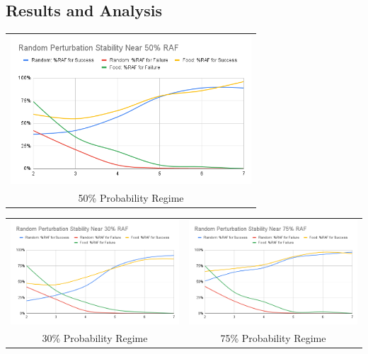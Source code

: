 \documentclass[11pt]{article}
\begin{document}
\subsection{Results and Analysis} 

\begin{center}
\begin{frame}
    \centering
      \begin{tabular}{c}
      \includegraphics[width=9cm]{perturbation.png} \\
      50\% Probability Regime
    \end{tabular}

    \centering
    \vspace{0.01em}
      \begin{tabular}{cc}
      \includegraphics[width=9cm]{PerturbationLow.png}
       &
       \includegraphics[width=9cm]{PerturbationHigh.png} \\
       30\% Probability Regime  & 75\% Probability Regime \\
       \end{tabular}
\end{frame}
\end{center}
\end{document}
